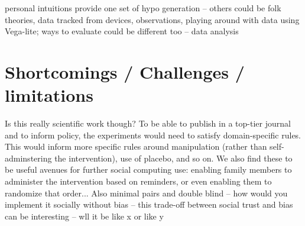 personal intuitions provide one set of hypo generation -- others could be folk theories, data tracked from devices, observations, playing around with data using Vega-lite; ways to evaluate could be different too -- data analysis


\section{Shortcomings / Challenges / limitations}
Is this really scientific work though? To be able to publish in a top-tier journal and to inform policy, the experiments would need to satisfy domain-specific rules. This would inform more specific rules around manipulation (rather than self-adminstering the intervention), use of placebo, and so on. We also find these to be useful avenues for further social computing use: enabling family members to administer the intervention based on reminders, or even enabling them to randomize that order... 
	Also minimal pairs and double blind -- how would you implement it socially without bias -- this trade-off between social trust and bias can be interesting -- wll it be like x or like y


